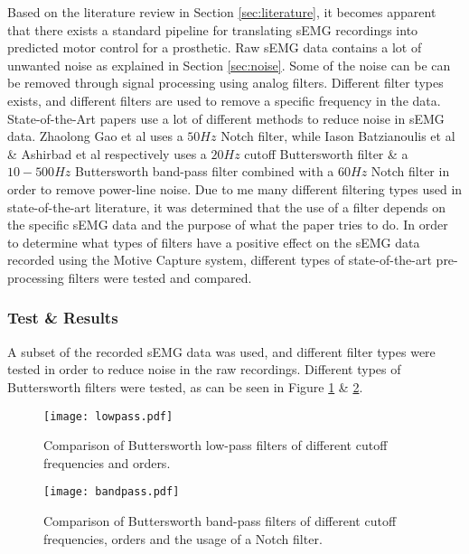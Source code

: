 \documentclass[../main.tex]{subfiles}
\begin{document}
Based on the literature review in Section \ref{sec:literature}, it becomes apparent that there exists a standard pipeline for translating sEMG recordings into predicted motor control for a prosthetic.
Raw sEMG data contains a lot of unwanted noise as explained in Section \ref{sec:noise}.
Some of the noise can be can be removed through signal processing using analog filters.
Different filter types exists, and different filters are used to remove a specific frequency in the data. 
State-of-the-Art papers use a lot of different methods to reduce noise in sEMG data.
Zhaolong Gao et al \cite{Zhaolong2021} uses a $50Hz$ Notch filter, while Iason Batzianoulis et al \cite{Batzianoulis2018} \& Ashirbad et al \cite{ashirbad2022} respectively uses a $20Hz$ cutoff Buttersworth filter \& a $10-500Hz$  Buttersworth band-pass filter combined with a $60Hz$ Notch filter in order to remove power-line noise.
Due to me many different filtering types used in state-of-the-art literature, it was determined that the use of a filter depends on the specific sEMG data and the purpose of what the paper tries to do.
In order to determine what types of filters have a positive effect on the sEMG data recorded using the Motive Capture system, different types of state-of-the-art pre-processing filters were tested and compared.


\subsubsection{Test \& Results}

A subset of the recorded sEMG data was used, and different filter types were tested in order to reduce noise in the raw recordings.
Different types of Buttersworth filters were tested, as can be seen in Figure \ref{fig:lowpass} \& \ref{fig:bandpass}.

\begin{figure}[H]
\begin{center}
\texttt{[image: lowpass.pdf]}
\caption{Comparison of Buttersworth low-pass filters of different cutoff frequencies and orders.}
\label{fig:lowpass}
\end{center}
\end{figure}
\begin{figure}[H]
\begin{center}
\texttt{[image: bandpass.pdf]}
\caption{Comparison of Buttersworth band-pass filters of different cutoff frequencies, orders and the usage of a Notch filter.}
\label{fig:bandpass}
\end{center}
\end{figure}
\end{document}
